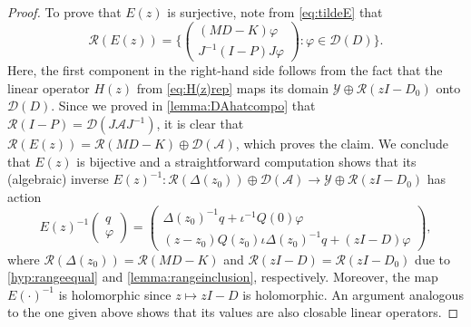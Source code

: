 \documentclass[english]{myarticle}
\begin{document}
\begin{sloppypar}
\begin{proof}
To prove that $E(z)$ is surjective, note from \eqref{eq:tildeE} that
\begin{equation*}
    \mathcal{R}(E(z)) = 
    \bigg\{
    \begin{pmatrix}
        (MD-K)\varphi \\
        J^{-1}(I-P)J\varphi
    \end{pmatrix}
    :
    \varphi \in \mathcal{D}(D) \bigg\}.
\end{equation*}
Here, the first component in the right-hand side follows from the fact that the linear operator $H(z)$ from \eqref{eq:H(z)rep} maps its domain $\mathcal{Y} \oplus \mathcal{R}(zI-D_0)$ onto $\mathcal{D}(D)$. Since we proved in \cref{lemma:DAhatcompo} that $\mathcal{R}(I-P) = \mathcal{D}(J\mathcal{A}J^{-1})$, it is clear that $\mathcal{R}(E(z)) = \mathcal{R}(MD-K) \oplus \mathcal{D}(\mathcal{A})$, which proves the claim. We conclude that $E(z)$ is bijective and a straightforward computation shows that its (algebraic) inverse $E(z)^{-1} : \mathcal{R}(\Delta(z_0)) \oplus \mathcal{D}(\mathcal{A}) \to \mathcal{Y} \oplus \mathcal{R}(zI-D_0)$ has action
\begin{equation} \label{eq:E(z)inv}
    E(z)^{-1} 
    \begin{pmatrix}
        q \\
        \varphi
    \end{pmatrix}
    =
    \begin{pmatrix}
        \Delta(z_0)^{-1}q + \iota^{-1} Q(0)\varphi \\
        (z-z_0)Q(z_0)\iota \Delta(z_0)^{-1}q + (zI-D)\varphi
    \end{pmatrix},
\end{equation}
where $\mathcal{R}(\Delta(z_0)) = \mathcal{R}(MD-K)$ and $\mathcal{R}(zI-D) = \mathcal{R}(zI-D_0)$ due to \ref{hyp:rangeequal} and \cref{lemma:rangeinclusion}, respectively. Moreover, the map $E(\cdot)^{-1}$ is holomorphic since $z \mapsto zI - D$ is holomorphic. An argument analogous to the one given above shows that its values are also closable linear operators.


\end{proof}
\end{sloppypar}
\end{document}
